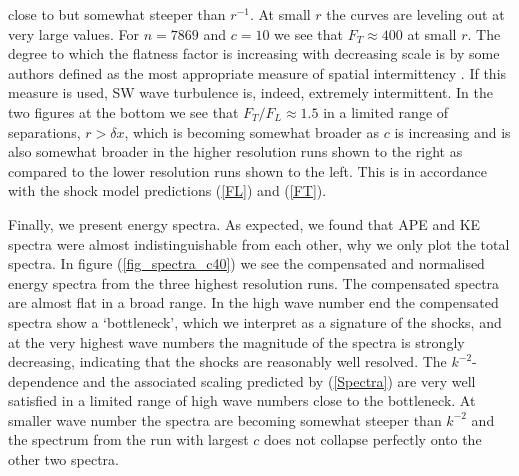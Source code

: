 close to but somewhat steeper than $ r^{-1} $. At small $ r $ the curves are
leveling out at very large values. For $ n = 7869 $ and $ c = 10 $ we see that
$ F_{T} \approx 400 $ at small $ r $. The degree to which the flatness factor
is increasing with decreasing scale is by some authors defined as the most
appropriate measure of spatial intermittency \cite[see for example][]{Frisch}.
If this measure is used, SW wave turbulence is, indeed, extremely intermittent.
In the two figures at the bottom we see that $ F_{T}/F_{L} \approx 1.5 $ in a
limited range of separations, $ r > \delta x $, which is becoming somewhat
broader as $ c $ is increasing and is also somewhat broader in the higher
resolution runs shown to the right as compared to the lower resolution runs
shown to the left. This is in accordance with the shock model predictions
(\ref{FL}) and (\ref{FT}).

Finally, we present energy spectra. As expected, we found that APE and KE
spectra were almost indistinguishable from each other, why we only plot the
total spectra. In figure (\ref{fig_spectra_c40}) we see the compensated and
normalised energy spectra from the three highest resolution runs. The
compensated spectra are almost flat in a broad range. In the high wave number
end the compensated spectra show a `bottleneck', which we interpret as a
signature of the shocks, and at the very highest wave numbers the magnitude of
the spectra is strongly decreasing, indicating that the shocks are reasonably
well resolved. The $ k^{-2} $-dependence and the associated scaling predicted
by (\ref{Spectra}) are very well satisfied in a limited range of high wave
numbers close to the bottleneck. At smaller wave number the spectra are
becoming somewhat steeper than $ k^{-2} $ and the spectrum from the run with
largest $ c $ does not collapse perfectly onto the other two spectra.
